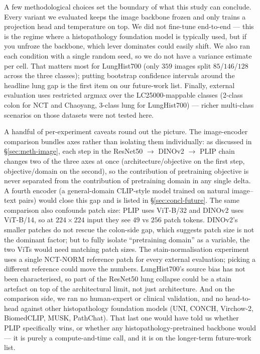 A few methodological choices set the boundary of what this study can conclude. Every variant we evaluated keeps the image backbone frozen and only trains a projection head and temperature on top. We did not fine-tune end-to-end --- this is the regime where a histopathology foundation model is typically used, but if you unfroze the backbone, which lever dominates could easily shift. We also ran each condition with a single random seed, so we do not have a variance estimate per cell. That matters most for LungHist700 (only $359$ images split $85$/$146$/$128$ across the three classes); putting bootstrap confidence intervals around the headline lung gap is the first item on our future-work list. Finally, external evaluation uses restricted argmax over the LC25000-mappable classes (2-class colon for NCT and Chaoyang, 3-class lung for LungHist700) --- richer multi-class scenarios on those datasets were not tested here.

A handful of per-experiment caveats round out the picture. The image-encoder comparison bundles axes rather than isolating them individually: as discussed in §\ref{sec:meth-image}, each step in the ResNet50 $\rightarrow$ DINOv2 $\rightarrow$ PLIP chain changes two of the three axes at once (architecture/objective on the first step, objective/domain on the second), so the contribution of pretraining objective is never separated from the contribution of pretraining domain in any single delta. A fourth encoder (a general-domain CLIP-style model trained on natural image--text pairs) would close this gap and is listed in §\ref{sec:concl-future}. The same comparison also confounds patch size: PLIP uses ViT-B/32 and DINOv2 uses ViT-B/14, so at $224 \times 224$ input they see $49$ vs $256$ patch tokens. DINOv2's smaller patches do not rescue the colon-side gap, which suggests patch size is not the dominant factor; but to fully isolate ``pretraining domain'' as a variable, the two ViTs would need matching patch sizes. The stain-normalisation experiment uses a single NCT-NORM reference patch for every external evaluation; picking a different reference could move the numbers. LungHist700's source bias has not been characterised, so part of the ResNet50 lung collapse could be a stain artefact on top of the architectural limit, not just architecture. And on the comparison side, we ran no human-expert or clinical validation, and no head-to-head against other histopathology foundation models (UNI, CONCH, Virchow-2, BiomedCLIP, MUSK, PathChat). That last one would have told us whether PLIP specifically wins, or whether any histopathology-pretrained backbone would --- it is purely a compute-and-time call, and it is on the longer-term future-work list.


